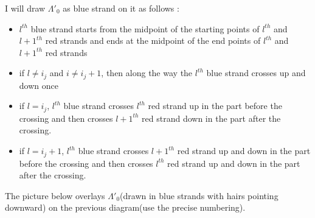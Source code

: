 I will draw $\Lambda'_0$ as blue strand on it as follows :

\begin{itemize}
\item $l^{th}$ blue strand starts from the midpoint of the starting points of $l^{th}$ and $l+1^{th}$ red strands and ends at the midpoint of the end points of $l^{th}$ and $l+1^{th}$ red strands

\item if $l \neq i_j$ and $i\neq i_j +1$, then along the way the $l^{th}$ blue strand crosses up and down once

\item if $l = i_j$, $l^{th}$ blue strand crosses $l^{th}$ red strand up in the part before the crossing and then crosses $l+1^{th}$ red strand down in the part after the crossing.

\item if $l = i_j + 1$, $l^{th}$ blue strand crosses $l+1^{th}$ red strand up and down in the part before the crossing and then crosses $l^{th}$ red strand up and down in the part after the crossing.
\end{itemize}

The picture below overlays $\Lambda'_0$(drawn in blue strands with hairs pointing downward) on the previous diagram(use the precise numbering).

